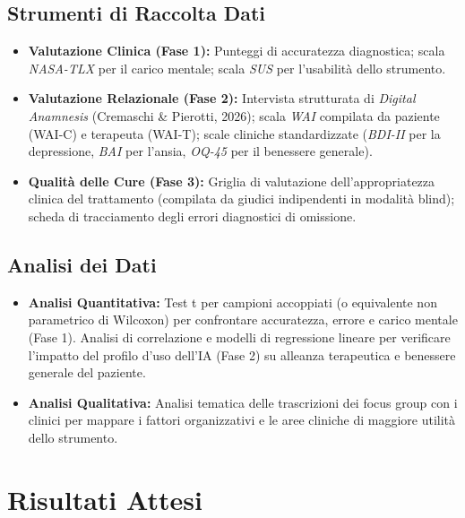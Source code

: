 \documentclass[11pt,a4paper]{article}
\begin{document}
\subsection{Strumenti di Raccolta Dati}
\begin{itemize}
    \item \textbf{Valutazione Clinica (Fase 1):} Punteggi di accuratezza diagnostica; scala \textit{NASA-TLX} per il carico mentale; scala \textit{SUS} per l'usabilità dello strumento.
    \item \textbf{Valutazione Relazionale (Fase 2):} Intervista strutturata di \textit{Digital Anamnesis} (Cremaschi \& Pierotti, 2026); scala \textit{WAI} compilata da paziente (WAI-C) e terapeuta (WAI-T); scale cliniche standardizzate (\textit{BDI-II} per la depressione, \textit{BAI} per l'ansia, \textit{OQ-45} per il benessere generale).
    \item \textbf{Qualità delle Cure (Fase 3):} Griglia di valutazione dell'appropriatezza clinica del trattamento (compilata da giudici indipendenti in modalità blind); scheda di tracciamento degli errori diagnostici di omissione.
\end{itemize}

\subsection{Analisi dei Dati}
\begin{itemize}
    \item \textbf{Analisi Quantitativa:} Test t per campioni accoppiati (o equivalente non parametrico di Wilcoxon) per confrontare accuratezza, errore e carico mentale (Fase 1). Analisi di correlazione e modelli di regressione lineare per verificare l'impatto del profilo d'uso dell'IA (Fase 2) su alleanza terapeutica e benessere generale del paziente.
    \item \textbf{Analisi Qualitativa:} Analisi tematica delle trascrizioni dei focus group con i clinici per mappare i fattori organizzativi e le aree cliniche di maggiore utilità dello strumento.
\end{itemize}

\section{Risultati Attesi}
\end{document}
